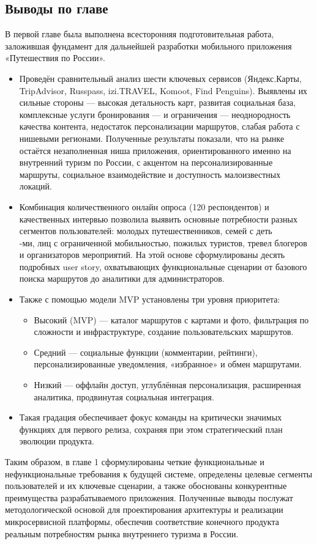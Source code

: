 \subsection*{Выводы по главе}
В первой главе была выполнена всесторонняя подготовительная работа, заложившая фундамент для дальнейшей разработки мобильного приложения «Путешествия по России».
\begin{itemize}
    \item Проведён сравнительный анализ шести ключевых сервисов (Яндекс.Карты, TripAdvisor, Russpass, izi.TRAVEL, Komoot, Find Penguins). Выявлены их сильные стороны — высокая детальность карт, развитая социальная база, комплексные услуги бронирования — и ограничения — неоднородность качества контента, недостаток персонализации маршрутов, слабая работа с нишевыми регионами. Полученные результаты показали, что на рынке остаётся незаполненная ниша приложения, ориентированного именно на внутренний туризм по России, с акцентом на персонализированные маршруты, социальное взаимодействие и доступность малоизвестных локаций.
    \item Комбинация количественного онлайн опроса (120 респондентов) и качественных интервью позволила выявить основные потребности разных сегментов пользователей: молодых путешественников, семей с деть\\-ми, лиц с ограниченной мобильностью, пожилых туристов, тревел блогеров и организаторов мероприятий. На этой основе сформулированы десять подробных user story, охватывающих функциональные сценарии от базового поиска маршрутов до аналитики для администраторов.
    \item Также с помощью модели MVP установлены три уровня приоритета:
    \begin{itemize}
        \item Высокий (MVP) — каталог маршрутов с картами и фото, фильтрация по сложности и инфраструктуре, создание пользовательских маршрутов.
        \item Средний — социальные функции (комментарии, рейтинги), персонализированные уведомления, «избранное» и обмен маршрутами.
        \item Низкий — оффлайн доступ, углублённая персонализация, расширенная аналитика, продвинутая социальная интеграция.
    \end{itemize}
    \item Такая градация обеспечивает фокус команды на критически значимых функциях для первого релиза, сохраняя при этом стратегический план эволюции продукта.
\end{itemize}
Таким образом, в главе 1 сформулированы четкие функциональные и нефункциональные требования к будущей системе, определены целевые сегменты пользователей и их ключевые сценарии, а также обоснованы конкурентные преимущества разрабатываемого приложения. Полученные выводы послужат методологической основой для проектирования архитектуры и реализации микросервисной платформы, обеспечив соответствие конечного продукта реальным потребностям рынка внутреннего туризма в России.




